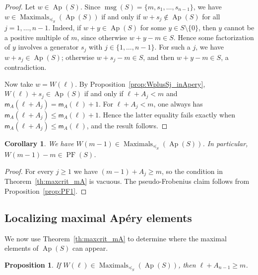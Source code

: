 \documentclass[12pt,a4paper]{amsart}
\newtheorem{proposition}[theorem]{Proposition}
\newtheorem{corollary}[theorem]{Corollary}
\theoremstyle{definition}
\begin{document}
\begin{proof}
Let $w\in\operatorname{Ap}(S)$. Since $\operatorname{msg}(S)=\{m,s_1,\ldots,s_{n-1}\}$, we have $w \in \operatorname{Maximals}_{\preceq_S}(\operatorname{Ap}(S))$ if and only if $w+s_j\notin\operatorname{Ap}(S)$ for all $j=1,\ldots,n-1$. Indeed, if $w+y\in\operatorname{Ap}(S)$ for some $y\in S\setminus\{0\}$, then $y$ cannot be a positive multiple of $m$, since otherwise $w+y-m\in S$. Hence some factorization of $y$ involves a generator $s_j$ with $j\in\{1,\ldots,n-1\}$. For such a $j$, we have $w+s_j\in\operatorname{Ap}(S)$; otherwise $w+s_j-m\in S$, and then $w+y-m\in S$, a contradiction.

Now take $w=W(\ell)$. By Proposition~\ref{prop:WplusSj_inApery}, $W(\ell)+s_j\in\operatorname{Ap}(S)$ if and only if $\ell+A_j<m$ and $\mathsf{m}_A(\ell+A_j)=\mathsf{m}_A(\ell)+1$. For $\ell+A_j<m$, one always has $\mathsf{m}_A(\ell+A_j)\le \mathsf{m}_A(\ell)+1$. Hence the latter equality fails exactly when $\mathsf{m}_A(\ell+A_j)\le \mathsf{m}_A(\ell)$, and the result follows.
\end{proof}

\begin{corollary}\label{cor:mminus1_maximal}
We have $W(m-1) \in \operatorname{Maximals}_{\preceq_S}(\operatorname{Ap}(S))$. In particular, $W(m-1)-m\in\operatorname{PF}(S)$.
\end{corollary}

\begin{proof}
For every $j\ge 1$ we have $(m-1)+A_j\ge m$, so the condition in Theorem~\ref{th:maxcrit_mA} is vacuous. The pseudo-Frobenius claim follows from Proposition~\ref{prop:PF1}.
\end{proof}

\subsection{Localizing maximal Apéry elements}

We now use Theorem~\ref{th:maxcrit_mA} to determine where the maximal elements of $\operatorname{Ap}(S)$ can appear.

\begin{proposition}\label{prop:tail_localization}
If $W(\ell) \in \operatorname{Maximals}_{\preceq_S}(\operatorname{Ap}(S))$, then $\ell+A_{n-1}\ge m$.
\end{proposition}
\end{document}

